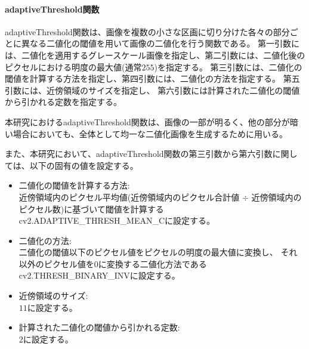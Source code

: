 \paragraph{adaptiveThreshold関数}
adaptiveThreshold関数は、画像を複数の小さな区画に切り分けた各々の部分ごとに異なる二値化の閾値を用いて画像の二値化を行う関数である。
第一引数には、二値化を適用するグレースケール画像を指定し、第二引数には、二値化後のピクセルにおける明度の最大値(通常$255$)を指定する。
第三引数には、二値化の閾値を計算する方法を指定し、第四引数には、二値化の方法を指定する。
第五引数には、近傍領域のサイズを指定し、
第六引数には計算された二値化の閾値から引かれる定数を指定する。
\par
本研究におけるadaptiveThreshold関数は、画像の一部が明るく、他の部分が暗い場合においても、全体として均一な二値化画像を生成するために用いる。
\par
また、本研究において、adaptiveThreshold関数の第三引数から第六引数に関しては、以下の固有の値を設定する。
\begin{itemize}
      \setlength{\itemsep}{0pt}
            \setlength{\parsep}{0pt}
      \item 二値化の閾値を計算する方法:\\
            近傍領域内のピクセル平均値(近傍領域内のピクセル合計値 $\div$ 近傍領域内のピクセル数)に基づいて閾値を計算するcv2.ADAPTIVE\_THRESH\_MEAN\_C\cite{AdaptiveThreshold}に設定する。
      \item 二値化の方法:\\
            二値化の閾値以下のピクセル値をピクセルの明度の最大値に変換し、
            それ以外のピクセル値を$0$に変換する二値化方法であるcv2.THRESH\_BINARY\_INV\cite{Threshold}に設定する。
      \item 近傍領域のサイズ:\\
            $11$に設定する。
      \item 計算された二値化の閾値から引かれる定数:\\
            $2$に設定する。
\end{itemize}
